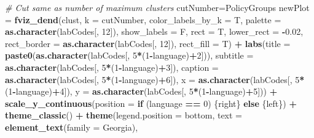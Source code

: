 \documentclass[
]{article}
\newenvironment{Shaded}{\begin{snugshade}}{\end{snugshade}}
\newcommand{\AttributeTok}[1]{\textcolor[rgb]{0.13,0.29,0.53}{#1}}
\newcommand{\CommentTok}[1]{\textcolor[rgb]{0.56,0.35,0.01}{\textit{#1}}}
\newcommand{\ControlFlowTok}[1]{\textcolor[rgb]{0.13,0.29,0.53}{\textbf{#1}}}
\newcommand{\DecValTok}[1]{\textcolor[rgb]{0.00,0.00,0.81}{#1}}
\newcommand{\FloatTok}[1]{\textcolor[rgb]{0.00,0.00,0.81}{#1}}
\newcommand{\FunctionTok}[1]{\textcolor[rgb]{0.13,0.29,0.53}{\textbf{#1}}}
\newcommand{\NormalTok}[1]{#1}
\newcommand{\OtherTok}[1]{\textcolor[rgb]{0.56,0.35,0.01}{#1}}
\newcommand{\SpecialCharTok}[1]{\textcolor[rgb]{0.81,0.36,0.00}{\textbf{#1}}}
\newcommand{\StringTok}[1]{\textcolor[rgb]{0.31,0.60,0.02}{#1}}
\begin{document}
\begin{Shaded}
\begin{Highlighting}[]
\CommentTok{\# Cut same as number of maximum clusters}
\NormalTok{cutNumber}\OtherTok{=}\NormalTok{PolicyGroups}
\NormalTok{newPlot }\OtherTok{=} \FunctionTok{fviz\_dend}\NormalTok{(clust, }\AttributeTok{k =}\NormalTok{ cutNumber, }\AttributeTok{color\_labels\_by\_k =}\NormalTok{ T, }\AttributeTok{palette =} \FunctionTok{as.character}\NormalTok{(labCodes[, }\DecValTok{12}\NormalTok{]), }\AttributeTok{show\_labels =}\NormalTok{ F,}
                    \AttributeTok{rect =}\NormalTok{ T, }\AttributeTok{lower\_rect =} \SpecialCharTok{{-}}\FloatTok{0.02}\NormalTok{, }\AttributeTok{rect\_border =} \FunctionTok{as.character}\NormalTok{(labCodes[, }\DecValTok{12}\NormalTok{]), }\AttributeTok{rect\_fill =}\NormalTok{ T) }\SpecialCharTok{+}
  \FunctionTok{labs}\NormalTok{(}\AttributeTok{title =} \FunctionTok{paste0}\NormalTok{(}\FunctionTok{as.character}\NormalTok{(labCodes[, }\DecValTok{5}\SpecialCharTok{*}\NormalTok{(}\DecValTok{1}\SpecialCharTok{{-}}\NormalTok{language)}\SpecialCharTok{+}\DecValTok{2}\NormalTok{])),}
       \AttributeTok{subtitle =} \FunctionTok{as.character}\NormalTok{(labCodes[, }\DecValTok{5}\SpecialCharTok{*}\NormalTok{(}\DecValTok{1}\SpecialCharTok{{-}}\NormalTok{language)}\SpecialCharTok{+}\DecValTok{3}\NormalTok{]),}
       \AttributeTok{caption =} \FunctionTok{as.character}\NormalTok{(labCodes[, }\DecValTok{5}\SpecialCharTok{*}\NormalTok{(}\DecValTok{1}\SpecialCharTok{{-}}\NormalTok{language)}\SpecialCharTok{+}\DecValTok{6}\NormalTok{]),}
       \AttributeTok{x =} \FunctionTok{as.character}\NormalTok{(labCodes[, }\DecValTok{5}\SpecialCharTok{*}\NormalTok{(}\DecValTok{1}\SpecialCharTok{{-}}\NormalTok{language)}\SpecialCharTok{+}\DecValTok{4}\NormalTok{]),}
       \AttributeTok{y =} \FunctionTok{as.character}\NormalTok{(labCodes[, }\DecValTok{5}\SpecialCharTok{*}\NormalTok{(}\DecValTok{1}\SpecialCharTok{{-}}\NormalTok{language)}\SpecialCharTok{+}\DecValTok{5}\NormalTok{])) }\SpecialCharTok{+}
  \FunctionTok{scale\_y\_continuous}\NormalTok{(}\AttributeTok{position =} \ControlFlowTok{if}\NormalTok{ (language }\SpecialCharTok{==} \DecValTok{0}\NormalTok{) \{}\StringTok{\textquotesingle{}right\textquotesingle{}}\NormalTok{\} }\ControlFlowTok{else}\NormalTok{ \{}\StringTok{\textquotesingle{}left\textquotesingle{}}\NormalTok{\}) }\SpecialCharTok{+} 
  \FunctionTok{theme\_classic}\NormalTok{() }\SpecialCharTok{+}
  \FunctionTok{theme}\NormalTok{(}\AttributeTok{legend.position =} \StringTok{\textquotesingle{}bottom\textquotesingle{}}\NormalTok{,}
        \AttributeTok{text =} \FunctionTok{element\_text}\NormalTok{(}\AttributeTok{family =} \StringTok{\textquotesingle{}Georgia\textquotesingle{}}\NormalTok{),}

\end{Highlighting}
\end{Shaded}
\end{document}
